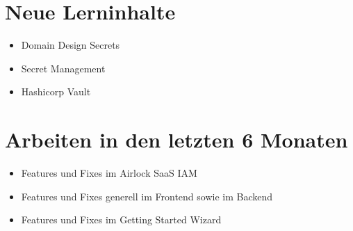 \section{Neue Lerninhalte}\label{sec:neue-lerninhalte}
\begin{itemize}
    \item Domain Design Secrets
    \item Secret Management
    \item Hashicorp Vault
\end{itemize}


\section{Arbeiten in den letzten 6 Monaten}\label{sec:arbeiten-in-den-letzten-6-monaten}
\begin{itemize}
    \item Features und Fixes im Airlock SaaS IAM
    \item Features und Fixes generell im Frontend sowie im Backend
    \item Features und Fixes im Getting Started Wizard
\end{itemize}
